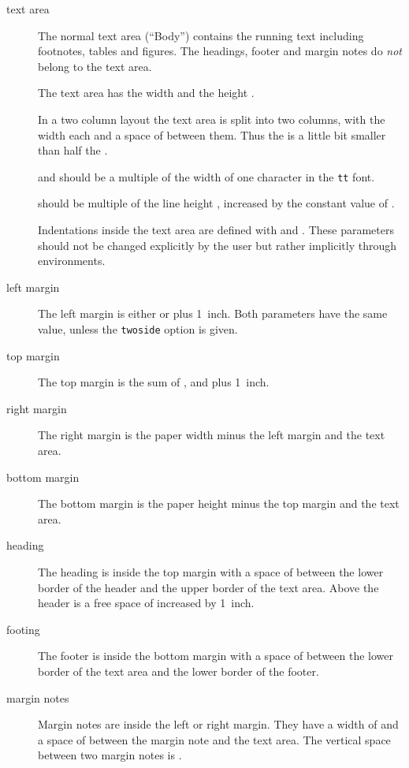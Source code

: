 \begin{description}

\item[text area]
	The normal text area (``Body'') contains the running text 
	including footnotes, tables and figures.  The headings, footer 
	and margin notes do \emph{not} belong to the text area.
        
	The text area has the width  
	and the height .
        
	In a two column layout the text area is split into two columns, with
	the width  each and a space of  between
	them.  Thus the  is a little bit smaller than half
	the .
	
	 and  should be a multiple of the
	width of one character in the \texttt{tt} font.
	
	 should be multiple of the line height
	, increased by the constant value of .
	
	Indentations inside the text area are defined with  and
	.  These parameters should not be changed explicitly
	by the user but rather implicitly through environments.
	
\item[left margin]
	The left margin is either  or  plus
	1~inch.  Both parameters have the same value, unless the
	\texttt{twoside} option is given.

\item[top margin]
	The top margin is the sum of ,  and 
	 plus 1~inch.

\item[right margin]
	The right margin is the paper width minus the left margin and 
	the text area.

\item[bottom margin]
	The bottom margin is the paper height minus the top margin and 
	the text area.
       
\item[heading]
	The heading is inside the top margin with a space of 
	between the lower border of the header and the upper border of the
	text area.  Above the header is a free space of 
	increased by 1~inch.
      
\item[footing] The footer is inside the bottom margin with a
	space of  between the lower border
	of the text area and the lower border of the footer.
	
\item[margin notes] Margin notes are inside the left or
	right margin.  They have a width of  and a space
	of  between the margin note and the text area.  The
	vertical space between two margin notes is .
		    
\end{description}

